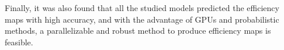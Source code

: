 Finally, it was also found that all the studied models predicted the efficiency maps with high accuracy, and with the advantage of GPUs and probabilistic methods, a parallelizable and robust method to produce efficiency maps is feasible.

